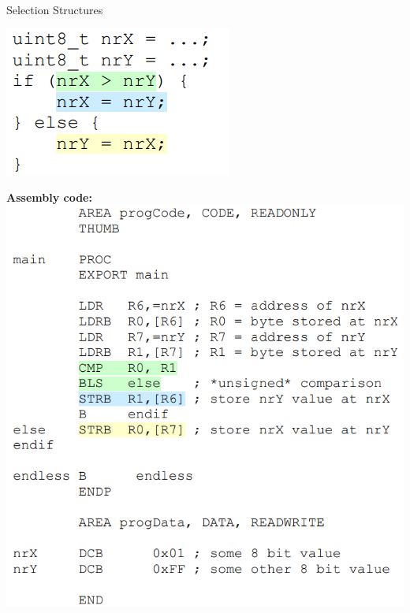 \begin{example2}{Selection Structures}
\begin{minipage}{0.38\linewidth}
\includegraphics[width=\linewidth]{images/ccodeex1.png}
\end{minipage}

\textbf{Assembly code:}\\
\includegraphics[width=\linewidth]{images/assemblycodeex1.png}
\end{example2}


